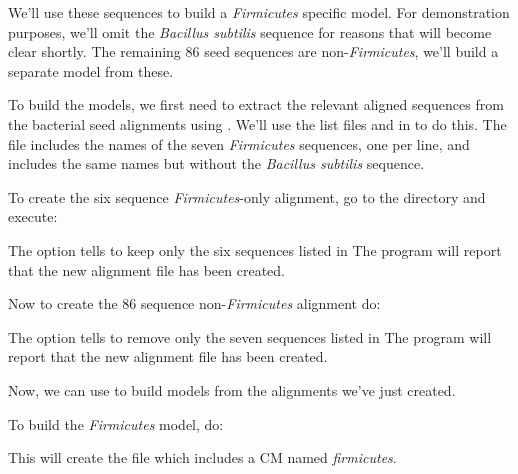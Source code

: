 We'll use these sequences to build a \emph{Firmicutes} specific model. 
For demonstration purposes, we'll omit the \emph{Bacillus subtilis}
sequence for reasons that will become clear shortly.
The remaining 86 seed sequences are non-\emph{Firmicutes}, we'll build 
a separate model from these. 

To build the models, we first need to extract the relevant aligned sequences
from the bacterial seed alignments using . We'll use
the list files  and  in
 to do this. The  file
includes the names of the seven \emph{Firmicutes} sequences, one per
line, and  includes the same names but without the
\emph{Bacillus subtilis} sequence. 

To create the six sequence \emph{Firmicutes}-only alignment, go to the
 directory and execute:


The  option tells  to keep only the
six sequences listed in 
The program will report that the new alignment file
 has been created. 

Now to create the 86 sequence non-\emph{Firmicutes} alignment do:


The  option tells  to remove only the
seven sequences listed in 
The program will report that the new alignment file
 has been created. 


Now, we can use  to build models from the alignments
we've just created. 

To build the \emph{Firmicutes} model, do:


This will create the file  which includes a CM
named \emph{firmicutes}. 

